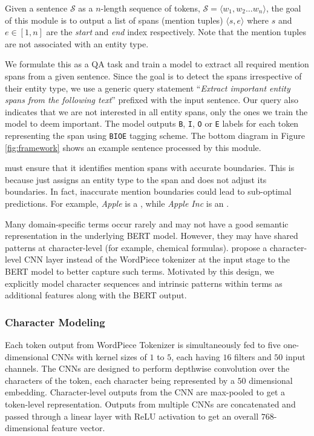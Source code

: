 Given a sentence $\mathcal{S}$ as a $n$-length sequence of tokens, $\mathcal{S} = \langle w_1, w_2 \ldots w_n \rangle$, the goal of this module is to output a list of spans (mention tuples) $\langle s, e\rangle$ where $s$ and $e \in [1, n]$ are the \textit{start} and \textit{end} index respectively. 
Note that the mention tuples are not associated with an entity type. 

We formulate this as a QA task and train a model to extract all required mention spans from a given sentence. Since the goal is to detect the spans irrespective of their entity type, we use a generic query statement ``\textit{Extract important entity spans from the following text}'' prefixed with the input sentence. Our query also indicates that we are not interested in all entity spans, only the ones we train the model to deem important. The model outputs \texttt{B}, \texttt{I}, \texttt{O} or \texttt{E} labels for each token representing the span using \texttt{BIOE} tagging scheme. The bottom diagram in Figure \ref{fig:framework} shows an example sentence processed by this module.

\spandetect{} must ensure that it identifies mention spans with accurate boundaries. This is because \spanclass{} just assigns an entity type to the span and does not adjust its boundaries. In fact, inaccurate mention boundaries could lead to sub-optimal predictions. For example, \textit{Apple} is a , while \textit{Apple Inc} is an .

Many domain-specific terms occur rarely and may not have a good semantic representation in the underlying BERT model. However, they may have  shared patterns at character-level (for example, chemical formulas). \cite{boukkouri2020characterbert} propose a character-level CNN layer instead of the WordPiece tokenizer at the input stage to the BERT model to better capture such terms. Motivated by this design, we explicitly model character sequences and intrinsic patterns within terms as additional features along with the BERT output.
 
\subsubsection{Character Modeling} Each token output from WordPiece Tokenizer is simultaneously fed to five one-dimensional CNNs with kernel sizes of $1$ to $5$, each having $16$ filters and $50$ input channels. The CNNs are designed to perform depthwise convolution over the characters of the token, each character being represented by a $50$ dimensional embedding. Character-level outputs from the CNN are max-pooled to get a token-level representation. Outputs from multiple CNNs are concatenated and passed through a linear layer with ReLU activation to get an overall $768$-dimensional feature vector.
    
